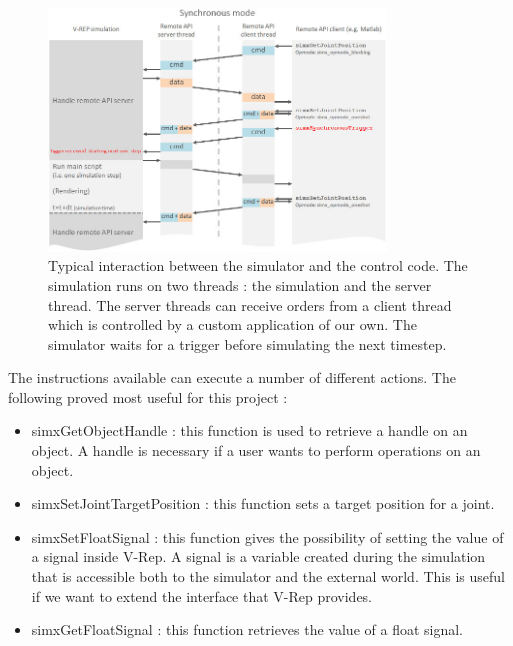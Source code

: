 \begin{figure}[htp]
\center
\includegraphics[width=0.8\textwidth]{figures/remoteApiSynchronous}
\caption[Simulation interaction]{Typical interaction between the simulator and the control code. The simulation runs on two threads : the simulation and the server thread. The server threads can receive orders from a client thread which is controlled by a custom application of our own. The simulator waits for a trigger before simulating the next timestep.\cite{vrep_manual}}
\label{fig:remoteApi}
\end{figure}

The instructions available can execute a number of different actions. The following proved most useful for this project :\begin{itemize}
\item simxGetObjectHandle : this function is used to retrieve a handle on an object. A handle is necessary if a user wants to perform operations on an object.
\item simxSetJointTargetPosition : this function sets a target position for a joint.
\item simxSetFloatSignal : this function gives the possibility of setting the value of a signal inside V-Rep. A signal is a variable created during the simulation that is accessible both to the simulator and the external world. This is useful if we want to extend the interface that V-Rep provides.
\item simxGetFloatSignal : this function retrieves the value of a float signal. 
\end{itemize}

%


